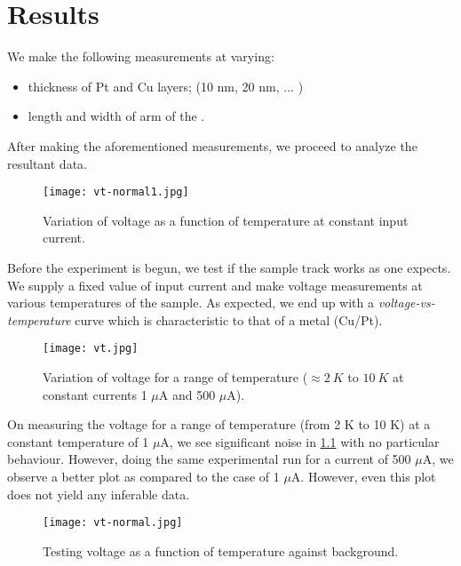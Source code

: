 \chapter{Results}

We make the following measurements at varying:

\begin{itemize}
    \item thickness of Pt and Cu layers; (10 nm, 20 nm, $\ldots$ )
    \item length and width of arm of the \Hst.
\end{itemize}

\label{chapter5}

After making the aforementioned measurements, we proceed to analyze the resultant data.

\begin{figure}[h!]
    \centering
    \texttt{[image: vt-normal1.jpg]}
    \caption{Variation of voltage as a function of temperature at constant input current.}
\end{figure}

Before the experiment is begun, we test if the sample track works as one expects.
We supply a fixed value of input current and make voltage measurements at various temperatures of the sample.
As expected, we end up with a \textit{voltage-vs-temperature} curve which is characteristic to that of a metal (Cu/Pt).

\begin{figure}[h!]
    \centering
    \texttt{[image: vt.jpg]}
    \caption{Variation of voltage for a range of temperature (\( \approx 2 \: K \) to \( 10 \: K \) at constant currents 1 \( \mu \)A and 500 \( \mu \)A).}
    \label{fig:vt}
\end{figure}

On measuring the voltage for a range of temperature (from 2 K to 10 K) at a constant temperature of 1 \( \mu \)A, we see significant noise in \cref{fig:vt} with no particular behaviour. However, doing the same experimental run for a current of 500 \( \mu \)A, we observe a better plot as compared to the case of 1 \( \mu \)A. However, even this plot does not yield any inferable data.

\clearpage

\begin{figure}[h!]
    \centering
    \texttt{[image: vt-normal.jpg]}
    \caption{Testing voltage as a function of temperature against background.}
\end{figure}

